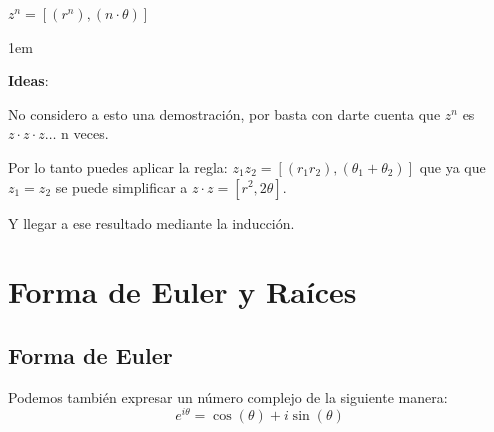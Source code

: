 \documentclass[12pt, fleqn]{report}                             %
\newenvironment{SmallIndentation}[1][0.75em]                    %
        {\begin{adjustwidth}{#1}{}\begin{footnotesize}}             %
        {\end{footnotesize}\end{adjustwidth}}                       %
\theoremstyle{break}                                            %
\newcommand{\Wrap}[1]           {\left( #1 \right)}             %
\newcommand{\Cos}[1] {\cos\Wrap{#1}}                            %
\newcommand{\Sin}[1] {\sin\Wrap{#1}}                            %
\begin{document}
\begin{itemize}
                    $z^n = [(r^n), (n \cdot \theta)]$

                    \begin{SmallIndentation}[1em]
                        \textbf{Ideas}:

                        No considero a esto una demostración, por basta con darte cuenta que
                        $z^n$ es $z \cdot z \cdot z \dots$ n veces.

                        Por lo tanto puedes aplicar la regla: $z_1z_2 = [(r_1r_2), (\theta_1 + \theta_2)]$
                        que ya que $z_1 = z_2$ se puede simplificar a $z \cdot z = [r^2, 2\theta]$.

                        Y llegar a ese resultado mediante la inducción.

                    \end{SmallIndentation}

            \clearpage
            

            \end{itemize}



    \chapter{Forma de Euler y Raíces}


        \clearpage
        \section{Forma de Euler}  

            Podemos también expresar un número complejo de la siguiente manera:
            \begin{equation}
                e^{i\theta} = \Cos{\theta} + i\Sin{\theta}
            \end{equation}
\end{document}
